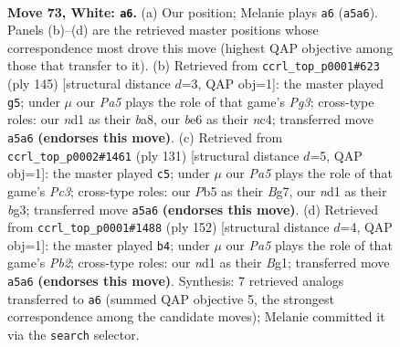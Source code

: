 \documentclass[11pt]{article}
\begin{document}
\clearpage

\begin{figure}[p]\centering
\begin{subfigure}{0.46\textwidth}\centering
\resizebox{\linewidth}{!}{%
\newchessgame
\chessboard[
  setfen={5k2/8/4b3/PP6/8/6K1/8/3n4 w - - 1 73},
  showmover=false,
  pgfstyle=straightmove, color=movearrow, markmove={a5-a6}
]}
\caption{}
\end{subfigure}\hfill
\begin{subfigure}{0.46\textwidth}\centering
\resizebox{\linewidth}{!}{%
\newchessgame
\chessboard[
  setfen={B7/8/6p1/8/2N2k2/8/4K3/b7 b - - 25 73},
  showmover=false,
  pgfstyle=straightmove, color=movearrow, markmove={g6-g5}
]}
\caption{}
\end{subfigure}
\\[4pt]
\begin{subfigure}{0.46\textwidth}\centering
\resizebox{\linewidth}{!}{%
\newchessgame
\chessboard[
  setfen={8/4k1b1/2p5/8/6B1/3K2B1/8/8 b - - 4 66},
  showmover=false,
  pgfstyle=straightmove, color=movearrow, markmove={c6-c5}
]}
\caption{}
\end{subfigure}\hfill
\begin{subfigure}{0.46\textwidth}\centering
\resizebox{\linewidth}{!}{%
\newchessgame
\chessboard[
  setfen={8/8/5p2/3k3b/8/8/1P1K4/6B1 w - - 8 77},
  showmover=false,
  pgfstyle=straightmove, color=movearrow, markmove={b2-b4}
]}
\caption{}
\end{subfigure}
\caption{\textbf{Move 73, White: \texttt{a6}.} (a) Our position; Melanie plays \texttt{a6} (\texttt{a5a6}). Panels (b)--(d) are the retrieved master positions whose correspondence most drove this move (highest QAP objective among those that transfer to it). (b) Retrieved from \texttt{ccrl\_top\_p0001\#623} (ply 145) [structural distance $d$=3, QAP obj=1]: the master played \texttt{g5}; under $\mu$ our \emph{Pa5} plays the role of that game's \emph{Pg3}; cross-type roles: our \emph{n}d1 as their \emph{b}a8, our \emph{b}e6 as their \emph{n}c4; transferred move \texttt{a5a6} \textbf{(endorses this move)}. (c) Retrieved from \texttt{ccrl\_top\_p0002\#1461} (ply 131) [structural distance $d$=5, QAP obj=1]: the master played \texttt{c5}; under $\mu$ our \emph{Pa5} plays the role of that game's \emph{Pc3}; cross-type roles: our \emph{P}b5 as their \emph{B}g7, our \emph{n}d1 as their \emph{b}g3; transferred move \texttt{a5a6} \textbf{(endorses this move)}. (d) Retrieved from \texttt{ccrl\_top\_p0001\#1488} (ply 152) [structural distance $d$=4, QAP obj=1]: the master played \texttt{b4}; under $\mu$ our \emph{Pa5} plays the role of that game's \emph{Pb2}; cross-type roles: our \emph{n}d1 as their \emph{B}g1; transferred move \texttt{a5a6} \textbf{(endorses this move)}. Synthesis: 7 retrieved analogs transferred to \texttt{a6} (summed QAP objective 5, the strongest correspondence among the candidate moves); Melanie committed it via the \texttt{search} selector.}
\label{fig:thought-m144}
\end{figure}
\end{document}
